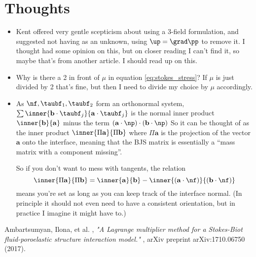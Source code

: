 \documentclass{article}
\begin{document}
\section{Thoughts}
\begin{itemize}
\item Kent offered very gentle scepticism about using a 3-field formulation, and suggested not having \up as an unknown, using $\up = \grad \pp$ to remove it. I thought \cite{ambartsumyan} had some opinion on this, but on closer reading I can't find it, so maybe that's from another article. I should read up on this.

\item Why is there a 2 in front of $\mu$ in equation \eqref{eq:stokes_stress}? If $\mu$ is just divided by 2 that's fine, but then I need to divide my choice by $\mu$ accordingly.
\item As $\nf, \taubf_1, \taubf_2$ form an orthonormal system, $\sum \inner{\mathbf{b} \cdot \taubf_j}{\mathbf{a} \cdot \taubf_j}$ is the normal inner product $\inner{\mathbf{b}}{\mathbf{a}}$ minus the term $(\mathbf{a} \cdot \np) \cdot (\mathbf{b} \cdot \np)$ So it can be thought of as the inner product $\inner{\Pi{\mathbf{a}}}{\Pi{\mathbf{b}}}$ where $\Pi\mathbf{a}$ is the projection of the vector $\mathbf{a}$ onto the interface, meaning that the BJS matrix is essentially a ``mass matrix with a component missing''.

  So if you don't want to mess with tangents, the relation $$\inner{\Pi\mathbf{a}}{\Pi\mathbf{b}} = \inner{\mathbf{a}}{\mathbf{b}} - \inner{(\mathbf{a} \cdot \nf)}{(\mathbf{b} \cdot \nf)}$$ means you're set as long as you can keep track of the interface normal. (In principle it should not even need to have a consistent orientation, but in practice I imagine it might have to.) 
 
\end{itemize}



\begin{thebibliography}{99}
{\sc Ambartsumyan, Ilona, et al. }, {\em "A Lagrange multiplier method for a Stokes-Biot fluid-poroelastic structure interaction model." }, arXiv preprint arXiv:1710.06750 (2017).
  
\end{thebibliography}
\end{document}
